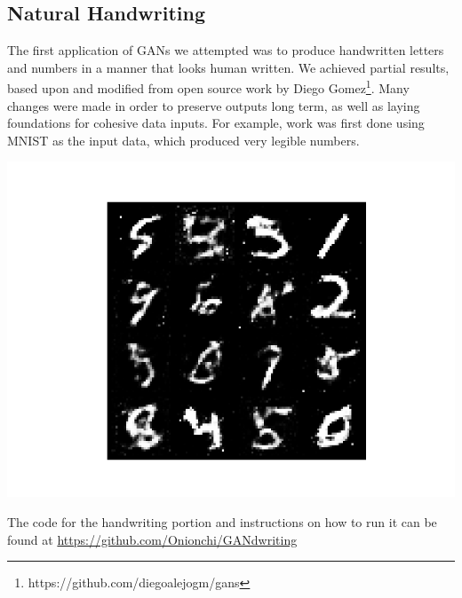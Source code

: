 \documentclass[12pt]{amsart}
\theoremstyle{definition}
\theoremstyle{remark}
\begin{document}
\subsection{Natural Handwriting}
The first application of GANs we attempted was to produce handwritten letters and
numbers in a manner that looks human written. We achieved partial results,
based upon and modified from open source work by Diego Gomez\footnote{https://github.com/diegoalejogm/gans}.
Many changes were made in order to preserve outputs long term, as well
as laying foundations for cohesive data inputs. For example, work was first
done using MNIST as the input data, which produced very legible numbers. \\
\begin{center}
    \includegraphics[scale=0.5]{output1.png} \\
\end{center}
The code for the handwriting portion and instructions on how to run it can be found at
\href{https://github.com/Onionchi/GANdwriting}{https://github.com/Onionchi/GANdwriting}
\end{document}
